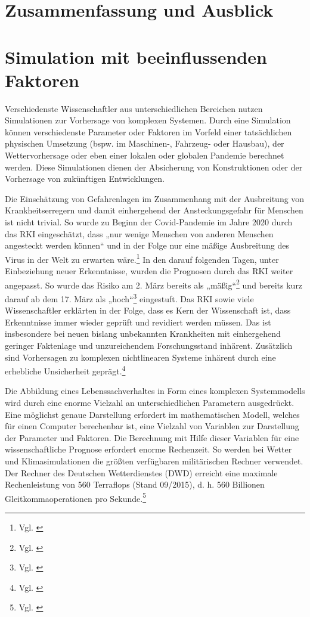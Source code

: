 \documentclass[12pt]{article}
\begin{document}
\section{Zusammenfassung und Ausblick}


\section{Simulation mit beeinflussenden Faktoren}
Verschiedenste Wissenschaftler aus unterschiedlichen Bereichen nutzen Simulationen zur Vorhersage von komplexen Systemen. Durch eine Simulation können verschiedenste Parameter oder Faktoren im Vorfeld einer tatsächlichen physischen Umsetzung (bspw. im Maschinen-, Fahrzeug- oder Hausbau), der Wettervorhersage oder eben einer lokalen oder globalen Pandemie berechnet werden. Diese Simulationen dienen der Absicherung von Konstruktionen oder der Vorhersage von zukünftigen Entwicklungen.

Die Einschätzung von Gefahrenlagen im Zusammenhang mit der Ausbreitung von Krankheitserregern und damit einhergehend der Ansteckungsgefahr für Menschen ist nicht trivial. So wurde zu Beginn der Covid-Pandemie im Jahre 2020 durch das RKI eingeschätzt, dass „nur wenige Menschen von anderen Menschen angesteckt werden können“ und in der Folge nur eine mäßige Ausbreitung des Virus in der Welt zu erwarten wäre.\footnote{Vgl. \cite{MerkurRKI}} In den darauf folgenden Tagen, unter Einbeziehung neuer Erkenntnisse, wurden die Prognosen durch das RKI weiter angepasst. So wurde das Risiko am 2. März bereits als „mäßig“\footnote{Vgl. \cite{ARDMedia01}} und bereits kurz darauf ab dem 17. März als „hoch“\footnote{Vgl. \cite{RKIhoch}} eingestuft. Das RKI sowie viele Wissenschaftler erklärten in der Folge, dass es Kern der Wissenschaft ist, dass Erkenntnisse immer wieder geprüft und revidiert werden müssen. Das ist insbesondere bei neuen bislang unbekannten Krankheiten mit einhergehend geringer Faktenlage und unzureichendem Forschungsstand inhärent. Zusätzlich sind Vorhersagen zu komplexen nichtlinearen Systeme inhärent durch eine erhebliche Unsicherheit geprägt.\footnote{Vgl. \cite{ZDFWissenschaft}}

Die Abbildung eines Lebenssachverhaltes in Form eines komplexen Systemmodells wird durch eine enorme Vielzahl an unterschiedlichen Parametern ausgedrückt. Eine möglichst genaue Darstellung erfordert im mathematischen Modell, welches für einen Computer berechenbar ist, eine Vielzahl von Variablen zur Darstellung der Parameter und Faktoren. Die Berechnung mit Hilfe dieser Variablen für eine wissenschaftliche Prognose erfordert enorme Rechenzeit. So werden bei Wetter und Klimasimulationen die größten verfügbaren militärischen Rechner verwendet. Der Rechner des Deutschen Wetterdienstes (DWD) erreicht eine maximale Rechenleistung von 560 Terraflops (Stand 09/2015), d. h. 560 Billionen Gleitkommaoperationen pro Sekunde.\footnote{Vgl. \cite{WeltDerPhysik}}
\end{document}

